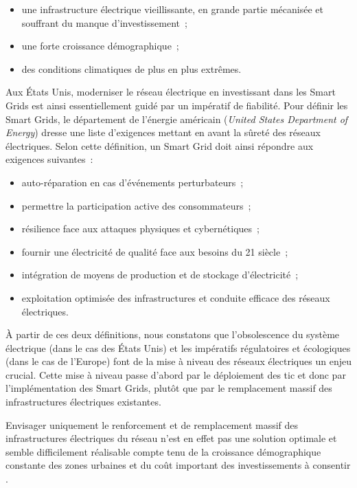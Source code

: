 \begin{itemize}
    \item une infrastructure électrique vieillissante, en grande partie
    mécanisée et souffrant du manque d'investissement~;
    \item une forte croissance démographique~;
    \item des conditions climatiques de plus en plus extrêmes.
\end{itemize}

Aux États Unis, moderniser le réseau électrique en investissant dans les Smart 
Grids est ainsi essentiellement guidé par un impératif de fiabilité. Pour 
définir les Smart Grids, le département de l'énergie américain (\textit{United 
States Department of Energy}) dresse une liste d'exigences mettant en avant la 
sûreté des réseaux électriques\cite{USDE}. Selon cette définition, un Smart Grid 
doit ainsi répondre aux exigences suivantes~:

\begin{itemize}
    \item auto-réparation en cas d'événements perturbateurs~;
    \item permettre la participation active des consommateurs~; 
    \item résilience face aux attaques physiques et cybernétiques~;
    \item fournir une électricité de qualité face aux besoins du 21
          siècle~;
    \item intégration de moyens de production et de stockage d'électricité~;
    \item exploitation optimisée des infrastructures et conduite efficace des 
réseaux électriques.
\end{itemize} 

À partir de ces deux définitions, nous constatons que l'obsolescence du système 
électrique (dans le cas des États Unis) et les impératifs régulatoires et 
écologiques (dans le cas de l'Europe) font de la mise à niveau des réseaux 
électriques un enjeu crucial. Cette mise à niveau passe d'abord par le 
déploiement des \gls{tic} et donc par l'implémentation des Smart Grids, plutôt 
que par le remplacement massif des infrastructures électriques existantes. 

Envisager uniquement le renforcement et de remplacement massif des 
infrastructures électriques du  réseau 
n'est en effet pas une solution optimale et semble difficilement réalisable 
compte tenu de la croissance démographique constante des zones urbaines et du 
coût important des investissements à consentir \cite{cre}.

